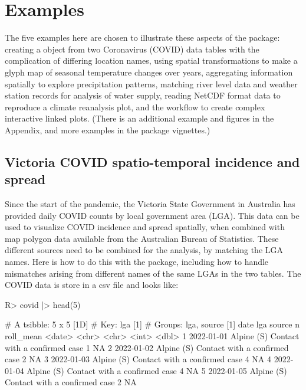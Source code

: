 \documentclass[
  shortnames]{jss}
\begin{document}
\hypertarget{examples}{%
\section{Examples}\label{examples}}

The five examples here are chosen to illustrate these aspects of the  package: creating a  object from two Coronavirus (COVID) data tables with the complication of differing location names, using spatial transformations to make a glyph map of seasonal temperature changes over years, aggregating information spatially to explore precipitation patterns, matching river level data and weather station records for analysis of water supply, reading NetCDF format data to reproduce a climate reanalysis plot, and the workflow to create complex interactive linked plots. (There is an additional example and figures in the Appendix, and more examples in the package vignettes.)

\hypertarget{covid}{%
\subsection{Victoria COVID spatio-temporal incidence and spread}\label{covid}}

Since the start of the pandemic, the Victoria State Government in Australia has provided daily COVID counts by local government area (LGA). This data can be used to visualize COVID incidence and spread spatially, when combined with map polygon data available from the Australian Bureau of Statistics. These different sources need to be combined for the analysis, by matching the LGA names. Here is how to do this with the  package, including how to handle mismatches arising from different names of the same LGAs in the two tables. The COVID data is store in a csv file and looks like:

\begin{CodeChunk}
\begin{CodeInput}
R> covid |> head(5)
\end{CodeInput}
\begin{CodeOutput}
# A tsibble: 5 x 5 [1D]
# Key:       lga [1]
# Groups:    lga, source [1]
  date       lga        source                            n roll_mean
  <date>     <chr>      <chr>                         <int>     <dbl>
1 2022-01-01 Alpine (S) Contact with a confirmed case     1        NA
2 2022-01-02 Alpine (S) Contact with a confirmed case     2        NA
3 2022-01-03 Alpine (S) Contact with a confirmed case     4        NA
4 2022-01-04 Alpine (S) Contact with a confirmed case     4        NA
5 2022-01-05 Alpine (S) Contact with a confirmed case     2        NA
\end{CodeOutput}
\end{CodeChunk}
\end{document}
